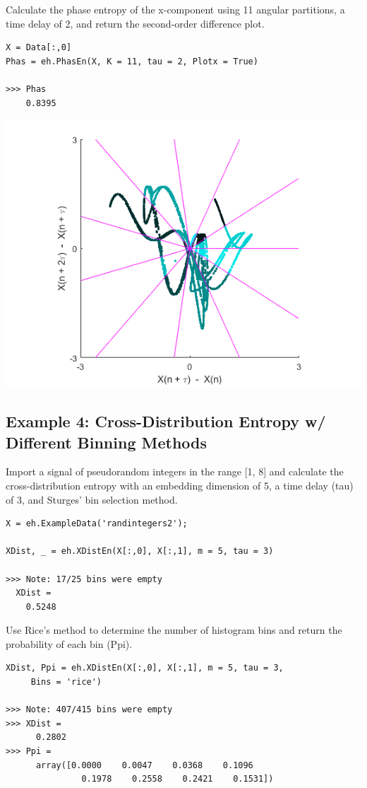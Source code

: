 \documentclass[12pt, a4paper, titlepage, openany]{book}
\begin{document}
Calculate the phase  entropy of the x-component using 11 angular partitions, a time delay of 2, and return the second-order difference plot.
\begin{verbatim}
X = Data[:,0]
Phas = eh.PhasEn(X, K = 11, tau = 2, Plotx = True)

>>> Phas
	0.8395
\end{verbatim}
\includegraphics[scale=.6]{phasex2.png}


\newpage
\subsection{\normalsize Example 4: \hspace{15mm} Cross-Distribution Entropy w/ Different Binning Methods}
\noindent Import a signal of pseudorandom integers in the range [1, 8] and calculate the cross-distribution entropy with an embedding dimension of 5, a time delay (tau) of 3, and Sturges' bin selection method.
\begin{verbatim}
X = eh.ExampleData('randintegers2');

XDist, _ = eh.XDistEn(X[:,0], X[:,1], m = 5, tau = 3)

>>> Note: 17/25 bins were empty
  XDist = 
    0.5248
\end{verbatim}
Use Rice's method to determine the number of histogram bins and return the probability of each bin (Ppi).
\begin{verbatim}
XDist, Ppi = eh.XDistEn(X[:,0], X[:,1], m = 5, tau = 3, 
	 Bins = 'rice')

>>> Note: 407/415 bins were empty
>>> XDist =
      0.2802
>>> Ppi =
      array([0.0000    0.0047    0.0368    0.1096  
    	       0.1978    0.2558    0.2421    0.1531])
\end{verbatim}
\end{document}
